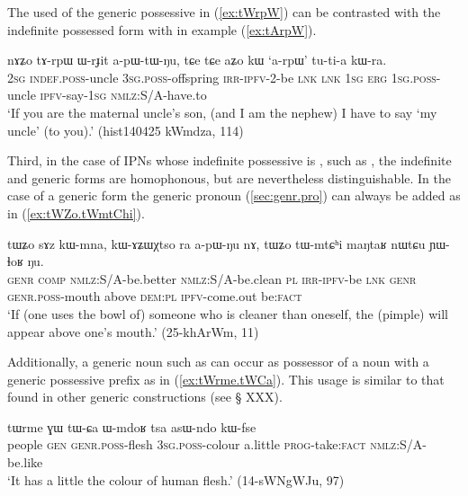 The used of the generic possessive  in (\ref{ex:tWrpW}) can be contrasted with the indefinite possessed form with  in example (\ref{ex:tArpW}).

\begin{exe}
\ex  \label{ex:tArpW}
\gll
nɤʑo 	tɤ-rpɯ 	ɯ-rɟit 	a-pɯ-tɯ-ŋu, 	tɕe 	tɕe 	aʑo 	kɯ 	`a-rpɯ' 	tu-ti-a 	kɯ-ra.  \\
\textsc{2sg} \textsc{indef.poss}-uncle \textsc{3sg.poss}-offspring \textsc{irr-ipfv}-2-be \textsc{lnk} \textsc{lnk} \textsc{1sg} \textsc{erg}  \textsc{1sg.poss}-uncle \textsc{ipfv}-say-\textsc{1sg} \textsc{nmlz:S/A}-have.to  \\
\glt `If you are the maternal uncle's son, (and I am the nephew) I have to say `my uncle' (to you).'  (hist140425 kWmdza, 114)
\end{exe}

Third, in the case of IPNs whose indefinite possessive is , such as , the indefinite and generic forms are homophonous, but are nevertheless distinguishable. In the case of a generic form the generic pronoun  (\ref{sec:genr.pro}) can always be added as in (\ref{ex:tWZo.tWmtChi}). 

\begin{exe}
\ex  \label{ex:tWZo.tWmtChi}
\gll tɯʑo sɤz kɯ-mna, kɯ-ɤʑɯχtso ra a-pɯ-ŋu nɤ,  tɯʑo tɯ-mtɕʰi maŋtaʁ nɯtɕu ɲɯ-ɬoʁ ŋu. \\
\textsc{genr} \textsc{comp} \textsc{nmlz}:S/A-be.better \textsc{nmlz}:S/A-be.clean \textsc{pl} \textsc{irr}-\textsc{ipfv}-be \textsc{lnk}  \textsc{genr} \textsc{genr.poss}-mouth above \textsc{dem:pl} \textsc{ipfv}-come.out be:\textsc{fact} \\
\glt `If (one uses the bowl of) someone who is cleaner than oneself, the (pimple) will appear above one's mouth.' (25-khArWm, 11)
\end{exe}

Additionally, a generic noun such as  can occur as possessor of a noun with a generic possessive prefix as in (\ref{ex:tWrme.tWCa}). This usage is similar to that found in other generic constructions (see § XXX).

\begin{exe}
\ex  \label{ex:tWrme.tWCa}
\gll tɯrme ɣɯ tɯ-ɕa ɯ-mdoʁ tsa asɯ-ndo kɯ-fse \\
people \textsc{gen} \textsc{genr.poss}-flesh \textsc{3sg.poss}-colour a.little \textsc{prog}-take:\textsc{fact} \textsc{nmlz}:S/A-be.like \\
\glt `It has a little the colour of human flesh.' (14-sWNgWJu, 97)
\end{exe}

